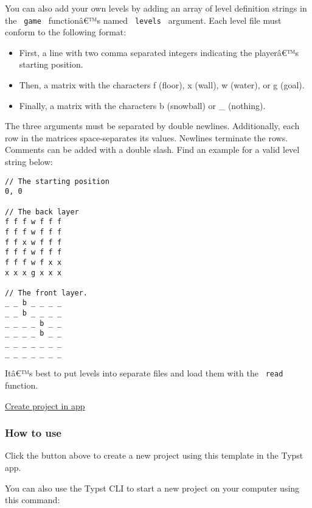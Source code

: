 \begin{Shaded}
\begin{Highlighting}[]

\end{Highlighting}
\end{Shaded}

You can also add your own levels by adding an array of level definition
strings in the \texttt{\ game\ } functionâ€™s named \texttt{\ levels\ }
argument. Each level file must conform to the following format:

\begin{itemize}
\tightlist
\item
  First, a line with two comma separated integers indicating the
  playerâ€™s starting position.
\item
  Then, a matrix with the characters f (floor), x (wall), w (water), or
  g (goal).
\item
  Finally, a matrix with the characters b (snowball) or \_ (nothing).
\end{itemize}

The three arguments must be separated by double newlines. Additionally,
each row in the matrices space-separates its values. Newlines terminate
the rows. Comments can be added with a double slash. Find an example for
a valid level string below:

\begin{verbatim}
// The starting position
0, 0

// The back layer
f f f w f f f
f f f w f f f
f f x w f f f
f f f w f f f
f f f w f x x
x x x g x x x

// The front layer.
_ _ b _ _ _ _
_ _ b _ _ _ _
_ _ _ _ b _ _
_ _ _ _ b _ _
_ _ _ _ _ _ _
_ _ _ _ _ _ _
\end{verbatim}

Itâ€™s best to put levels into separate files and load them with the
\texttt{\ read\ } function.

\href{/app?template=icicle&version=0.1.0}{Create project in app}

\subsubsection{How to use}\label{how-to-use}

Click the button above to create a new project using this template in
the Typst app.

You can also use the Typst CLI to start a new project on your computer
using this command:


